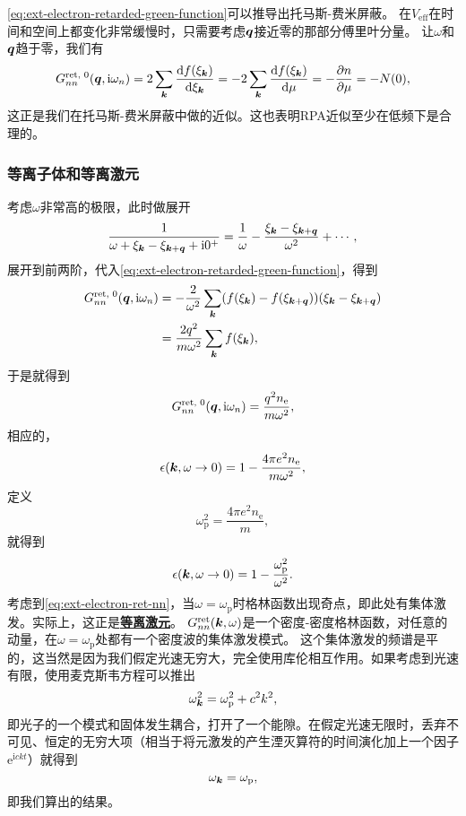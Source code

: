 \documentclass[hyperref, UTF8, a4paper]{ctexart}
\newcommand*{\ii}{\mathrm{i}}
\newcommand*{\ee}{\mathrm{e}}
\newcommand*{\concept}[1]{\underline{\textbf{#1}}}
\begin{document}
\eqref{eq:ext-electron-retarded-green-function}可以推导出托马斯-费米屏蔽。
在$V_\text{eff}$在时间和空间上都变化非常缓慢时，只需要考虑$\vb*{q}$接近零的那部分傅里叶分量。
让$\omega$和$\vb*{q}$趋于零，我们有
\[
    G_{nn}^\text{ret, 0}(\vb*{q}, \ii \omega_n) = 2 \sum_{\vb*{k}} \dv{f(\xi_{\vb*{k}})}{\xi_{\vb*{k}}} = - 2 \sum_{\vb*{k}} \dv{f(\xi_{\vb*{k}})}{\mu} = - \pdv{n}{\mu} = - N(0),
\]
这正是我们在托马斯-费米屏蔽中做的近似。这也表明RPA近似至少在低频下是合理的。

\subsubsection{等离子体和等离激元}

考虑$\omega$非常高的极限，此时做展开
\[
    \frac{1}{\omega + \xi_{\vb*{k}} - \xi_{\vb*{k} + \vb*{q}} + \ii 0^+} = \frac{1}{\omega} - \frac{\xi_{\vb*{k}} - \xi_{\vb*{k} + \vb*{q}}}{\omega^2} + \cdots,
\]
展开到前两阶，代入\eqref{eq:ext-electron-retarded-green-function}，得到
\[
    \begin{aligned}
        G_{nn}^\text{ret, 0}(\vb*{q}, \ii \omega_n) &= - \frac{2}{\omega^2} \sum_{\vb*{k}} (f(\xi_{\vb*{k}}) - f(\xi_{\vb*{k} + \vb*{q}})) (\xi_{\vb*{k}} - \xi_{\vb*{k} + \vb*{q}}) \\
        &= \frac{2 q^2}{m \omega^2} \sum_{\vb*{k}} f(\xi_{\vb*{k}}), 
    \end{aligned}
\]
于是就得到
\begin{equation}
    G_{nn}^\text{ret, 0}(\vb*{q}, \ii \omega_n) = \frac{q^2 n_\text{e}}{m \omega^2},
\end{equation}
相应的，
\[
    \epsilon(\vb*{k}, \omega \to 0) = 1 - \frac{4 \pi e^2 n_\text{e}}{m \omega^2},
\]
定义
\begin{equation}
    \omega_\text{p}^2 = \frac{4 \pi e^2 n_\text{e}}{m},
\end{equation}
就得到
\begin{equation}
    \epsilon(\vb*{k}, \omega \to 0) = 1 - \frac{\omega_\text{p}^2}{\omega^2}.
\end{equation}
考虑到\eqref{eq:ext-electron-ret-nn}，当$\omega = \omega_\text{p}$时格林函数出现奇点，即此处有集体激发。实际上，这正是\concept{等离激元}。
$G^\text{ret}_{nn}(\vb*{k}, \omega)$是一个密度-密度格林函数，对任意的动量，在$\omega = \omega_\text{p}$处都有一个密度波的集体激发模式。
这个集体激发的频谱是平的，这当然是因为我们假定光速无穷大，完全使用库伦相互作用。如果考虑到光速有限，使用麦克斯韦方程可以推出
\begin{equation}
    \omega_{\vb*{k}}^2 = \omega_\text{p}^2 + c^2 k^2,
\end{equation}
即光子的一个模式和固体发生耦合，打开了一个能隙。在假定光速无限时，丢弃不可见、恒定的无穷大项（相当于将元激发的产生湮灭算符的时间演化加上一个因子$\ee^{\ii c k t}$）就得到
\[
    \omega_{\vb*{k}} = \omega_\text{p},
\]
即我们算出的结果。
\end{document}
